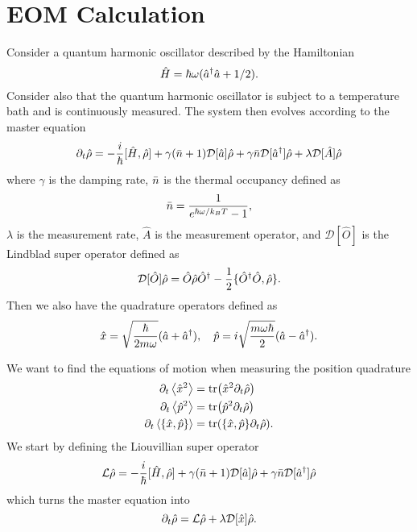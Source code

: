 \section{EOM Calculation}
Consider a quantum harmonic oscillator described by the Hamiltonian
\begin{equation}
    \hat{H} = \hbar \omega ( \hat{a}^{\dagger} \hat{a} + 1/2 ).
\end{equation}
Consider also that the quantum harmonic oscillator is subject to a temperature bath and is continuously measured. The system then evolves according to the master equation
\begin{equation}
    \partial_t \hat{\rho} = -\frac{i}{\hbar} [\hat{H}, \hat{\rho}] + \gamma (\bar{n} + 1 ) \mathcal{D}[\hat{a}] \hat{\rho} + \gamma \bar{n} \mathcal{D}[\hat{a}^{\dagger}] \hat{\rho} + \lambda \mathcal{D}[\hat{A}] \hat{\rho} \label{eq:master}
\end{equation}
where $\gamma$ is the damping rate, $\bar{n}$ is the thermal occupancy defined as 
\begin{equation}
    \bar{n} = \frac{1}{e^{\hbar \omega / k_B T} - 1},
\end{equation}
$\lambda$ is the measurement rate, $\hat{A}$ is the measurement operator, and $\mathcal{D}[\hat{O}]$ is the Lindblad super operator defined as
\begin{equation}
    \mathcal{D}[\hat{O}] \hat{\rho} = \hat{O} \hat{\rho} \hat{O}^\dagger - \frac{1}{2} \{ \hat{O}^\dagger \hat{O}, \hat{\rho} \}.
\end{equation}
Then we also have the quadrature operators defined as 
\begin{equation}
    \hat{x} = \sqrt{\frac{\hbar}{2 m \omega}} (\hat{a} + \hat{a}^{\dagger}), \quad \hat{p} = i \sqrt{\frac{m \omega \hbar}{2}} (\hat{a} - \hat{a}^{\dagger}).
\end{equation}

We want to find the equations of motion when measuring the position quadrature
\begin{align}
    \dt\expval{\xop^2} &= \tr(\xop^2 \dt \dmatrix)\label{eq:x2} \\
    \dt\expval{\pop^2} &= \tr(\pop^2 \dt \dmatrix)\label{eq:p2}\\
    \dt\expval{\acomm{\xop}{\pop}} &= \tr(\acomm{\xop}{\pop} \dt \dmatrix). \label{eq:xp}
\end{align}
We start by defining the Liouvillian super operator
\begin{equation}
    \mathcal{L}\hat{\rho} = -\frac{i}{\hbar} [\hat{H}, \hat{\rho}] + \gamma (\bar{n} + 1 ) \mathcal{D}[\hat{a}] \hat{\rho} + \gamma \bar{n} \mathcal{D}[\hat{a}^{\dagger}] \hat{\rho}
\end{equation}
which turns the master equation into
\begin{equation}
    \partial_t \hat{\rho} = \mathcal{L}\hat{\rho} + \lambda \mathcal{D}[\hat{x}] \hat{\rho}.
\end{equation}

